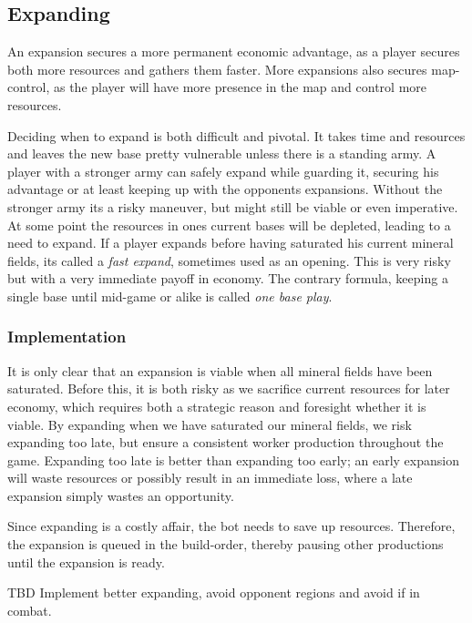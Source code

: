 	
	
	\subsection*{Expanding}
	An expansion secures a more permanent economic advantage, as a player secures both more resources and gathers them faster. More expansions also secures map-control, as the player will have more presence in the map and control more resources.
	
	Deciding when to expand is both difficult and pivotal. It takes time and resources and leaves the new base pretty vulnerable unless there is a standing army. A player with a stronger army can safely expand while guarding it, securing his advantage or at least keeping up with the opponents expansions. Without the stronger army its a risky maneuver, but might still be viable or even imperative. At some point the resources in ones current bases will be depleted, leading to a need to expand. If a player expands before having saturated his current mineral fields, its called a \emph{fast expand}, sometimes used as an opening. This is very risky but with a very immediate payoff in economy. The contrary formula, keeping a single base until mid-game or alike is called \emph{one base play}.
	
		\subsubsection*{Implementation}
		It is only clear that an expansion is viable when all mineral fields have been saturated. Before this, it is both risky as we sacrifice current resources for later economy, which requires both a strategic reason and foresight whether it is viable. By expanding when we have saturated our mineral fields, we risk expanding too late, but ensure a consistent worker production throughout the game. Expanding too late is better than expanding too early; an early expansion will waste resources or possibly result in an immediate loss, where a late expansion simply wastes an opportunity.
		
		Since expanding is a costly affair, the bot needs to save up resources. Therefore, the expansion is queued in the build-order, thereby pausing other productions until the expansion is ready.
		
		TBD Implement better expanding, avoid opponent regions and avoid if in combat.
	
